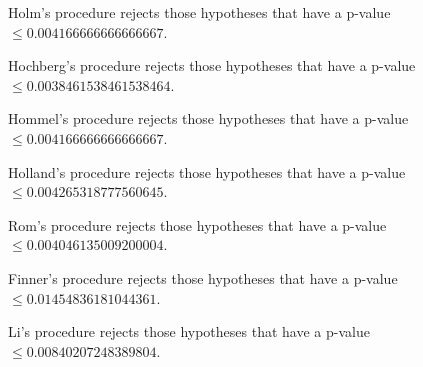 \documentclass[a4paper,10pt]{article}
\begin{document}
\begin{landscape}
Holm's procedure rejects those hypotheses that have a p-value $\le0.004166666666666667$.


Hochberg's procedure rejects those hypotheses that have a p-value $\le0.0038461538461538464$.


Hommel's procedure rejects those hypotheses that have a p-value $\le0.004166666666666667$.


Holland's procedure rejects those hypotheses that have a p-value $\le0.004265318777560645$.


Rom's procedure rejects those hypotheses that have a p-value $\le0.004046135009200004$.


Finner's procedure rejects those hypotheses that have a p-value $\le0.01454836181044361$.


Li's procedure rejects those hypotheses that have a p-value $\le0.00840207248389804$.



\newpage


\end{landscape}
\end{document}
